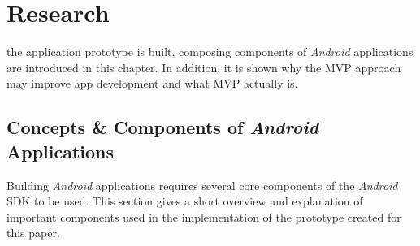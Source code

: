 %



\section{Research}
\label{sec:research}
 the application prototype is built, composing components of \emph{Android} applications are introduced in this chapter. In addition, it is shown why the MVP approach may improve app development and what MVP actually is.

\subsection{Concepts \& Components of \emph{Android} Applications}

Building \emph{Android} applications requires several core components of the \emph{Android} SDK to be used. This section gives a short overview and explanation of important components used in the implementation of the prototype created for this paper.

